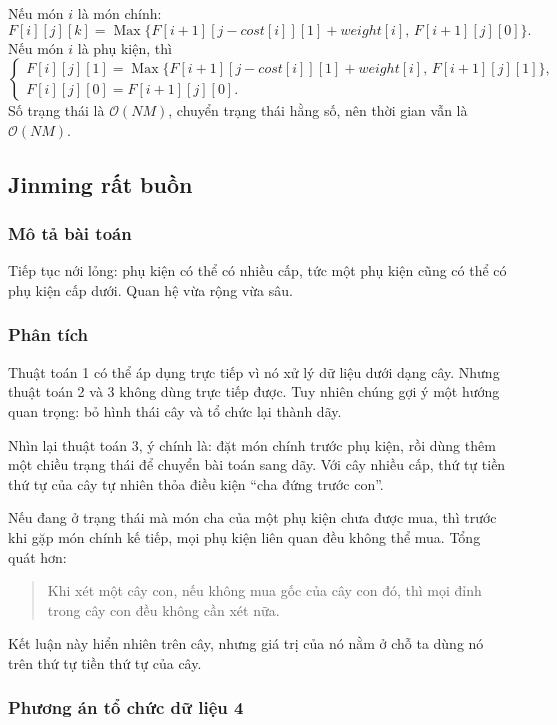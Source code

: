 \documentclass[11pt]{article}
\newcommand{\Oh}{\mathcal{O}}
\newcommand{\Max}{\operatorname{Max}}
\begin{document}
Nếu món \(i\) là món chính:
\[
  F[i][j][k]=
  \Max\{F[i+1][j-\mathit{cost}[i]][1]+\mathit{weight}[i],\,
        F[i+1][j][0]\}.
\]
Nếu món \(i\) là phụ kiện, thì
\[
\begin{cases}
F[i][j][1]=
  \Max\{F[i+1][j-\mathit{cost}[i]][1]+\mathit{weight}[i],\,
        F[i+1][j][1]\},\\
F[i][j][0]=F[i+1][j][0].
\end{cases}
\]
Số trạng thái là \(\Oh(NM)\), chuyển trạng thái hằng số, nên thời gian vẫn là
\(\Oh(NM)\).

\subsection{Jinming rất buồn}

\subsubsection*{Mô tả bài toán}

Tiếp tục nới lỏng: phụ kiện có thể có nhiều cấp, tức một phụ kiện cũng có thể
có phụ kiện cấp dưới. Quan hệ vừa rộng vừa sâu.

\subsubsection*{Phân tích}

Thuật toán 1 có thể áp dụng trực tiếp vì nó xử lý dữ liệu dưới dạng cây. Nhưng
thuật toán 2 và 3 không dùng trực tiếp được. Tuy nhiên chúng gợi ý một hướng
quan trọng: bỏ hình thái cây và tổ chức lại thành dãy.

Nhìn lại thuật toán 3, ý chính là: đặt món chính trước phụ kiện, rồi dùng thêm
một chiều trạng thái để chuyển bài toán sang dãy. Với cây nhiều cấp, thứ tự
tiền thứ tự của cây tự nhiên thỏa điều kiện ``cha đứng trước con''.

Nếu đang ở trạng thái mà món cha của một phụ kiện chưa được mua, thì trước khi
gặp món chính kế tiếp, mọi phụ kiện liên quan đều không thể mua. Tổng quát
hơn:

\begin{quote}
Khi xét một cây con, nếu không mua gốc của cây con đó, thì mọi đỉnh trong cây
con đều không cần xét nữa.
\end{quote}

Kết luận này hiển nhiên trên cây, nhưng giá trị của nó nằm ở chỗ ta dùng nó
trên thứ tự tiền thứ tự của cây.

\subsubsection*{Phương án tổ chức dữ liệu 4}
\end{document}
